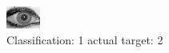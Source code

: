 \begin{figure}[h!]
\begin{center}
\includegraphics[width=0.60\columnwidth]{figures/ID2044_class_1_target_2.png}
\end{center}
\caption{ Classification: 1 actual target: 2}
\label{fig:ID2044_class_1_target_2}
\end{figure}
